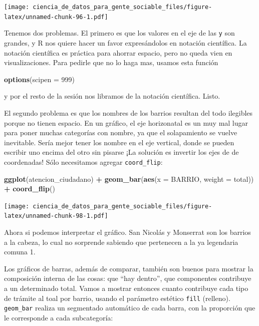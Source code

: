 \documentclass[]{book}
\newenvironment{Shaded}{\begin{snugshade}}{\end{snugshade}}
\newcommand{\KeywordTok}[1]{\textcolor[rgb]{0.13,0.29,0.53}{\textbf{#1}}}
\newcommand{\DataTypeTok}[1]{\textcolor[rgb]{0.13,0.29,0.53}{#1}}
\newcommand{\DecValTok}[1]{\textcolor[rgb]{0.00,0.00,0.81}{#1}}
\newcommand{\StringTok}[1]{\textcolor[rgb]{0.31,0.60,0.02}{#1}}
\newcommand{\OperatorTok}[1]{\textcolor[rgb]{0.81,0.36,0.00}{\textbf{#1}}}
\newcommand{\NormalTok}[1]{#1}
\begin{document}
\texttt{[image: ciencia\_de\_datos\_para\_gente\_sociable\_files/figure-latex/unnamed-chunk-96-1.pdf]}

Tenemos dos problemas. El primero es que los valores en el eje de las
\texttt{y} son grandes, y R nos quiere hacer un favor expresándolos en
notación científica. La notación científica es práctica para ahorrar
espacio, pero no queda vien en visualizaciones. Para pedirle que no lo
haga mas, usamos esta función

\begin{Shaded}
\begin{Highlighting}[]
\KeywordTok{options}\NormalTok{(}\DataTypeTok{scipen =} \DecValTok{999}\NormalTok{)}
\end{Highlighting}
\end{Shaded}

y por el resto de la sesión nos libramos de la notación científica.
Listo.

El segundo problema es que los nombres de los barrios resultan del todo
ilegibles porque no tienen espacio. En un gráfico, el eje horizonatal es
un muy mal lugar para poner muchas categorías con nombre, ya que el
solapamiento se vuelve inevitable. Sería mejor tener los nombre en el
eje vertical, donde se pueden escribir uno encima del otro sin pisarse
¡La solución es invertir los ejes de de coordenadas! Sólo necesitamos
agregar \texttt{coord\_flip}:

\begin{Shaded}
\begin{Highlighting}[]
\KeywordTok{ggplot}\NormalTok{(atencion_ciudadano) }\OperatorTok{+}
\StringTok{    }\KeywordTok{geom_bar}\NormalTok{(}\KeywordTok{aes}\NormalTok{(}\DataTypeTok{x =}\NormalTok{ BARRIO, }\DataTypeTok{weight =}\NormalTok{ total)) }\OperatorTok{+}
\StringTok{    }\KeywordTok{coord_flip}\NormalTok{()}
\end{Highlighting}
\end{Shaded}

\texttt{[image: ciencia\_de\_datos\_para\_gente\_sociable\_files/figure-latex/unnamed-chunk-98-1.pdf]}

Ahora si podemos interpretar el gráfico. San Nicolás y Monserrat son los
barrios a la cabeza, lo cual no sorprende sabiendo que pertenecen a la
ya legendaria comuna 1.

Los gráficos de barras, además de comparar, también son buenos para
mostrar la composición interna de las cosas: que ``hay dentro'', que
componentes contribuye a un determinado total. Vamos a mostrar entonces
cuanto contribuye cada tipo de trámite al toal por barrio, usando el
parámetro estético \texttt{fill} (relleno). \texttt{geom\_bar} realiza
un segmentado automático de cada barra, con la proporción que le
corresponde a cada subcategoría:
\end{document}

